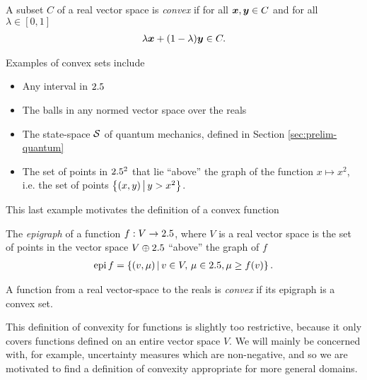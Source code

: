 \begin{defn}\label{defn:convex-set}
  A subset $C$ of a real vector space is \emph{convex} if for all $\bm{x},\bm{y}\in C$ and for all $\lambda\in [0,1]$
  \begin{align}
    \lambda \bm{x} + (1-\lambda)\bm{y}\in C.
  \end{align}
\end{defn}
Examples of convex sets include
\begin{itemize}
  \item Any interval in $2.5$
  \item The balls in any normed vector space over the reals
  \item The state-space $\dops$ of quantum mechanics, defined in Section \ref{sec:prelim-quantum}
  \item The set of points in $2.5^2$ that lie ``above'' the graph of the function $x\mapsto x^2$, i.e. the set of points $\left\{(x,y)\,\middle|\,y > x^2\right\}$.
\end{itemize}
This last example motivates the definition of a convex function
\begin{defn}\label{defn:epigraph}
  The \emph{epigraph} of a function $f:V\to2.5$, where $V$ is a real vector space is the set of points in the vector space $V\oplus 2.5$ ``above'' the graph of $f$
  \begin{align}
    \operatorname{epi} f = \left\{(v, \mu)\,\middle|\,v\in V,\, \mu\in2.5, \mu \geq f(v)\right\}.
  \end{align}
\end{defn}
\begin{defn}\label{defn:real-convex-function}
  A function from a real vector-space to the reals is \emph{convex} if its epigraph is a convex set.
\end{defn}
This definition of convexity for functions is slightly too restrictive, because it only covers functions defined on an entire vector space $V$. We will mainly be concerned with, for example, uncertainty measures which are non-negative, and so we are motivated to find a definition of convexity appropriate for more general domains.

